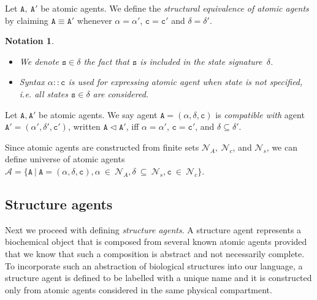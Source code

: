 \documentclass{entcs}
\renewcommand{\~}[0]{\texttildelow}
\newtheorem{notation}[thm]{Notation}
\begin{document}
\begin{definition}
Let $\mathtt{A},~\mathtt{A}'$ be atomic agents. We define the \emph{structural equivalence of atomic agents} by claiming $\mathtt{A}\equiv\mathtt{A}'$ whenever $\mathtt{\alpha} = \mathtt{\alpha}'$, $\mathtt{c} = \mathtt{c}'$ and $\delta = \delta'$.
\end{definition}

\begin{notation}
{~}
\begin{itemize}
\item We denote $\mathtt{s}\in\delta$ the fact that $\mathtt{s}$ is included in the state signature~$\delta$.
\item Syntax $\alpha::\mathtt{c}$ is used for expressing atomic agent when state is not specified, i.e. all states $\mathtt{s} \in \delta$ are considered.
\end{itemize}
\end{notation}

\begin{defn}
Let $\mathtt{A},\mathtt{A}'$ be atomic agents. We say agent $\mathtt{A}=(\alpha, \delta, \mathtt{c})$ is \emph{compatible with} agent $\mathtt{A}'=(\alpha', \delta', \mathtt{c}')$, written $\mathtt{A} \lhd \mathtt{A}'$, iff $\alpha = \alpha'$, $\mathtt{c} = \mathtt{c}'$, and $\delta \subseteq \delta'$. 
\end{defn}

\begin{theorem}
Since atomic agents are constructed from finite sets $\mathcal{N}_{A},~\mathcal{N}_{c}$, and $\mathcal{N}_{s}$, we can define universe of atomic agents $\mathcal{A} = \{ \mathtt{A}~|~\mathtt{A} = (\alpha, \delta, \mathtt{c}), \alpha~\in~\mathcal{N}_{A}, \delta~\subseteq~\mathcal{N}_{s},  \mathtt{c}~\in~\mathcal{N}_{c} \}$.
\end{theorem}

\subsection{Structure agents}

Next we proceed with defining \emph{structure agents}. A structure agent represents a biochemical object that is composed from several known atomic agents provided that we know that such a composition is abstract and not necessarily complete. To incorporate such an abstraction of biological structures into our language, a structure agent is defined to be labelled with a unique name and it is constructed only from atomic agents considered in the same physical compartment. 
\end{document}

